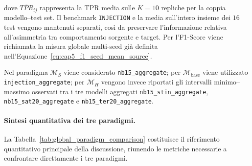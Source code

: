 dove $\overline{TPR}_{ij}$ rappresenta la TPR media sulle $K=10$ repliche per la coppia modello--test set. 
Il benchmark \texttt{INJECTION} e la media sull'intero insieme dei $16$ test vengono mantenuti separati, così da preservare l'informazione relativa all'asimmetria tra comportamento sorgente e target. 
Per l'F1-Score viene richiamata la misura globale multi-seed già definita nell'Equazione~\eqref{eq:cap5_f1_seed_mean_source}.

Nel paradigma $\mathcal{M}_{S}$ viene considerato \texttt{nb15\_aggregate}; per $\mathcal{M}_{\mathrm{base}}$ viene utilizzato \newline \texttt{injection\_aggregate}; per $\mathcal{M}_{H}$ vengono invece riportati gli intervalli minimo--massimo osservati tra i tre modelli aggregati \texttt{nb15\_stin\_aggregate}, \texttt{nb15\_sat20\_aggregate} e \newline \texttt{nb15\_ter20\_aggregate}.

\paragraph{Sintesi quantitativa dei tre paradigmi.}
La Tabella~\ref{tab:global_paradigm_comparison} costituisce il riferimento quantitativo principale della discussione, riunendo le metriche necessarie a confrontare direttamente i tre paradigmi.

